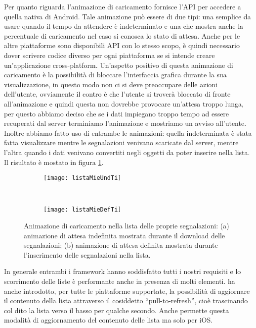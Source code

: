			\noindent Per quanto riguarda l'animazione di caricamento \tisdk{} fornisce 
			l'API per accedere a quella nativa di Android. 
			Tale animazione può essere di due tipi: una semplice da usare quando 
			il tempo da attendere è indeterminato e 
			una che mostra anche la percentuale di caricamento nel caso si conosca 
			lo stato di attesa.
			Anche per le altre piattaforme sono disponibili API con lo stesso scopo, 
			è quindi necessario dover scrivere codice diverso per ogni piattaforma 
			se si intende creare un'applicazione cross-platform.
			Un'aspetto positivo di questa animazione di caricamento è la possibilità 
			di bloccare l'interfaccia grafica durante la sua visualizzazione, 
			in questo modo non ci si deve preoccupare delle azioni dell'utente, 
			ovviamente il contro è che l'utente si troverà bloccato di fronte 
			all'animazione e quindi questa non dovrebbe provocare un'attesa troppo 
			lunga, per questo abbiamo deciso che se i dati impiegano troppo tempo 
			ad essere recuperati dal server terminiamo l'animazione e mostriamo 
			un avviso all'utente. Inoltre abbiamo fatto uso di entrambe le animazioni: 
			quella indeterminata è stata fatta visualizzare mentre le segnalazioni 
			venivano scaricate dal server, mentre l'altra quando i dati venivano 
			convertiti negli oggetti da poter inserire nella lista. Il risultato 
			è mostato in figura \ref{fig:mieLoadTi}.
			
			\begin{figure}[H]
              \centering
              \begin{subfigure}[b]{0.485\textwidth}
                \texttt{[image: listaMieUndTi]}
                \caption{}
              \end{subfigure}
              ~
              \begin{subfigure}[b]{0.485\textwidth}
                \texttt{[image: listaMieDefTi]}
                \caption{}
              \end{subfigure}
              \caption{Animazione di caricamento nella lista delle proprie segnalazioni: 
                (a) animazione di attesa indefinita mostrata durante il download delle 
                segnalazioni; (b) animazione di attesa definita mostrata durante 
                l'inserimento delle segnalazioni nella lista.
  				}
              \label{fig:mieLoadTi}
            \end{figure}

			\noindent In generale entrambi i framework hanno soddisfatto tutti 
			i nostri requisiti e lo scorrimento delle liste è
			performante anche in presenza di molti elementi. \kendomob{} ha
			anche introdotto, per tutte le piattaforme supportate, la
			possibilità di aggiornare il contenuto della
			lista attraverso il cosiddetto ``pull-to-refresh'', cioè
			trascinando col dito la lista verso il basso per qualche secondo.
			Anche \tisdk{} permette questa modalità di aggiornamento del
			contenuto delle lista ma solo per iOS.
			 
